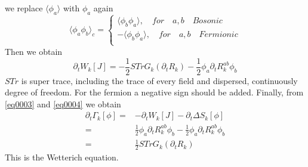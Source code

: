 \documentclass[UTF8]{article}
\begin{document}
we replace $\langle\phi_a\rangle$ with $\phi_a$ again
\begin{equation}
\langle\phi_a\phi_b\rangle_c=
\begin{cases}
\langle\phi_b\phi_a\rangle,\quad for \quad a,b \quad Bosonic\\
-\langle\phi_b\phi_a\rangle,\quad for \quad a,b \quad Fermionic\\
\end{cases}
\end{equation}
Then we obtain
\begin{equation}\label{eq0004}
\partial_tW_k[J]=-\frac{1}{2}STr{G_k(\partial_tR_k)}-\frac{1}{2}\phi_a\partial_tR^{ab}_{k}\phi_b
\end{equation}
$STr$ is super trace, including the trace of every field and dispersed, continuously degree of freedom. For the fermion a negative sign should be added.
Finally, from \eqref{eq0003} and \eqref{eq0004} we obtain
\begin{equation}
\begin{split}
\partial_t\Gamma_k[\phi]=& -\partial_tW_k[J]-\partial_t\Delta S_k[\phi]\\
=& \frac{1}{2}\phi_a\partial_tR^{ab}_{k}\phi_b-\frac{1}{2}\phi_a\partial_tR^{ab}_{k}\phi_b\\
=& \frac{1}{2}STr{G_k(\partial_tR_k)}
\end{split}
\end{equation}
This is the Wetterich equation.
\end{document}
